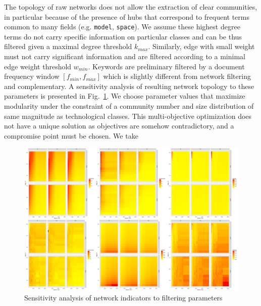 The topology of raw networks does not allow the extraction of clear communities, in particular because of the presence of hubs that correspond to frequent terms common to many fields (e.g. \texttt{model}, \texttt{space}). We assume these highest degree terms do not carry specific information on particular classes and can be thus filtered given a maximal degree threshold $k_{max}$. Similarly, edge with small weight must not carry significant information and are filtered according to a minimal edge weight threshold $w_{min}$. Keywords are preliminary filtered by a document frequency window $\left[ f_{min},f_{max} \right]$ which is slightly different from network filtering and complementary. A sensitivity analysis of resulting network topology to these parameters is presented in Fig.~\ref{fig:sensitivity}. We choose parameter values that maximize modularity under the constraint of a community number and size distribution of same magnitude as technological classes. This multi-objective optimization does not have a unique solution as objectives are somehow contradictory, and a compromise point must be chosen. We take 





\begin{figure}
\centering
\includegraphics[width=\textwidth]{figures/sensitivity_facet_allindics}
\caption{Sensitivity analysis of network indicators to filtering parameters}
\label{fig:sensitivity}
\end{figure}





